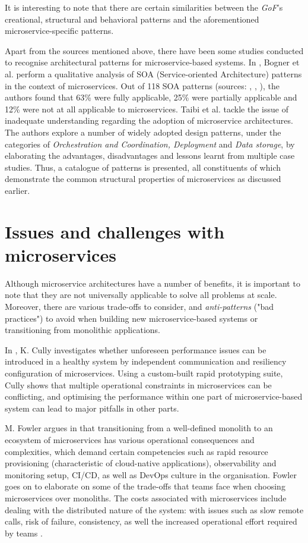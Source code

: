 It is interesting to note that there are certain similarities between the \textit{GoF}'s creational, structural and behavioral patterns \cite{gof94} and the aforementioned microservice-specific patterns. \linebreak

Apart from the sources mentioned above, there have been some studies conducted to recognise architectural patterns for microservice-based systems. In \cite{bogner18}, Bogner et al. perform a qualitative analysis of SOA (Service-oriented Architecture) patterns in the context of microservices. Out of 118 SOA patterns (sources: \cite{erl09}, \cite{erl12}, \cite{rotem12}), the authors found that 63\% were fully applicable, 25\% were partially applicable and 12\% were not at all applicable to
microservices. Taibi et al. \cite{taibi18} tackle the issue of inadequate understanding regarding the adoption of microservice architectures. The authors explore a number of widely adopted design patterns, under the categories of \textit{Orchestration and Coordination, Deployment} and \textit{Data storage}, by elaborating the advantages, disadvantages and lessons learnt from multiple case studies. Thus, a catalogue of patterns is presented, all constituents of which demonstrate the common structural properties of microservices as discussed earlier.

\section{Issues and challenges with microservices}

Although microservice architectures have a number of benefits, it is important to note that they are not universally applicable to solve all problems at scale. Moreover, there are various trade-offs to consider, and \textit{anti-patterns} ("bad practices") to avoid when building new microservice-based systems or transitioning from monolithic applications.

In \cite{cully20}, K. Cully investigates whether unforeseen performance issues can be introduced in a healthy system by independent communication and resiliency configuration of microservices. Using a custom-built rapid prototyping suite, Cully shows that multiple operational constraints in microservices can be conflicting, and optimising the performance within one part of microservice-based system can lead to major pitfalls in other parts.

M. Fowler argues in \cite{fowler14} that transitioning from a well-defined monolith to an ecosystem of microservices has various operational consequences and complexities, which demand certain competencies such as rapid resource provisioning (characteristic of cloud-native applications), observability and monitoring setup, CI/CD, as well as DevOps culture in the organisation. Fowler goes on to elaborate on some of the trade-offs that teams face when choosing microservices over monoliths. The costs associated with microservices include dealing with the distributed nature of the system: with issues such as slow remote calls, risk of failure, consistency, as well the increased operational effort required by teams \cite{fowler15}.

